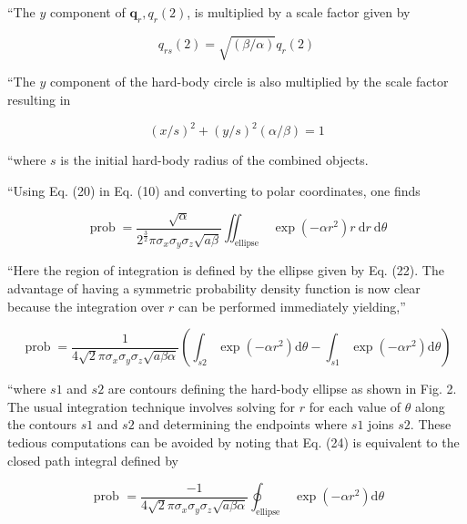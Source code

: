 ``The $y$ component of $\boldsymbol{q}_{r}, q_{r}(2)$, is multiplied by a scale factor given by

\begin{equation}
    q_{r s}(2)=\sqrt{(\beta / \alpha)} q_{r}(2)
\end{equation}

``The $y$ component of the hard-body circle is also multiplied by the scale factor resulting in


\begin{equation}
    (x / s)^{2}+(y / s)^{2}(\alpha / \beta)=1
\end{equation}

``where $s$ is the initial hard-body radius of the combined objects.

``Using Eq. (20) in Eq. (10) and converting to polar coordinates, one finds

\begin{equation}
    \operatorname{prob}=\frac{\sqrt{\alpha}}{2^{\frac{3}{2}} \pi \sigma_{x} \sigma_{y} \sigma_{z} \sqrt{a \beta}} \iint_{\text {ellipse }} \exp \left(-\alpha r^{2}\right) r \mathrm{~d} r \mathrm{~d} \theta
\end{equation}

``Here the region of integration is defined by the ellipse given by Eq. (22). The advantage of having a symmetric probability density function is now clear because the integration over $r$ can be performed immediately yielding,''


\begin{equation}
    \operatorname{prob}=\frac{1}{4 \sqrt{2} \pi \sigma_{x} \sigma_{y} \sigma_{z} \sqrt{a \beta \alpha}}\left(\int_{s 2} \exp \left(-\alpha r^{2}\right) \mathrm{d} \theta-\int_{s 1} \exp \left(-\alpha r^{2}\right) \mathrm{d} \theta\right)
\end{equation}

``where $s 1$ and $s 2$ are contours defining the hard-body ellipse as shown in Fig. 2. The usual integration technique involves solving for $r$ for each value of $\theta$ along the contours $s 1$ and $s 2$ and determining the endpoints where $s 1$ joins $s 2$. These tedious computations can be avoided by noting that Eq. (24) is equivalent to the closed path integral defined by

\begin{equation}
    \text { prob }=\frac{-1}{4 \sqrt{2} \pi \sigma_{x} \sigma_{y} \sigma_{z} \sqrt{a \beta \alpha}} \oint_{\text {ellipse }} \exp \left(-\alpha r^{2}\right) \mathrm{d} \theta
\end{equation}

